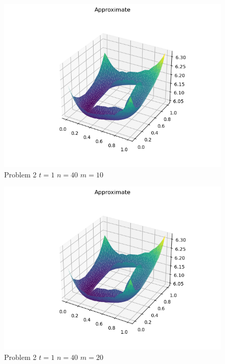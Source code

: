 \documentclass{report}
\begin{document}
\begin{figure}[h]
	\caption{Problem 2 $t = 1$ $n = 40$ $m = 10$}
	\includegraphics[width=\textwidth]{example.png}
\end{figure}
\begin{figure}[h]
	\caption{Problem 2 $t = 1$ $n = 40$ $m = 20$}
	\includegraphics[width=\textwidth]{example.png}
\end{figure}
\end{document}
